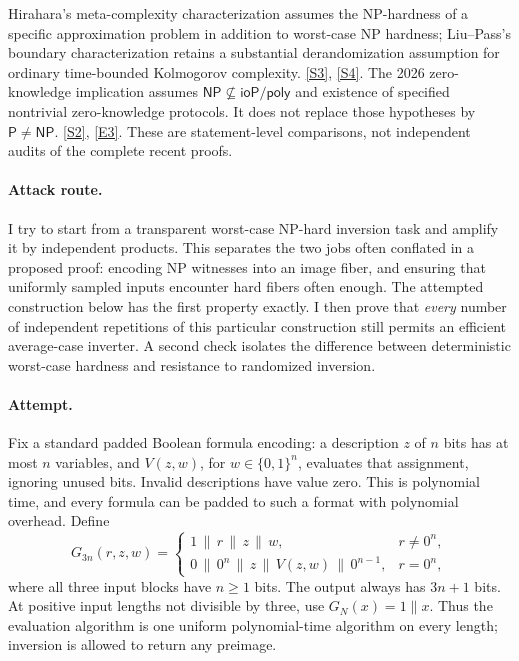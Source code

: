 \documentclass[11pt,a4paper]{article}
\newcommand{\sref}[2]{\hyperlink{source:#1:#2}{[S#2]}}
\newcommand{\eref}[2]{\hyperlink{extra:#1:#2}{[E#2]}}
\numberwithin{equation}{section}
\begin{document}
Hirahara's meta-complexity characterization assumes the NP-hardness of a
specific approximation problem in addition to worst-case NP hardness;
Liu--Pass's boundary characterization retains a substantial derandomization
assumption for ordinary time-bounded Kolmogorov complexity.
\sref{30006686}{3}, \sref{30006686}{4}. The 2026 zero-knowledge implication assumes
$\mathsf{NP}\not\subseteq\mathsf{ioP/poly}$ and existence of specified
nontrivial zero-knowledge protocols. It does not replace those hypotheses
by $\mathsf P\ne\mathsf{NP}$. \sref{30006686}{2}, \eref{30006686}{3}.
These are statement-level comparisons, not independent audits of the
complete recent proofs.

\paragraph{Attack route.}
I try to start from a transparent worst-case NP-hard inversion task and
amplify it by independent products. This separates the two jobs often
conflated in a proposed proof: encoding NP witnesses into an image fiber,
and ensuring that uniformly sampled inputs encounter hard fibers often
enough. The attempted construction below has the first property exactly.
I then prove that \emph{every} number of independent repetitions of this
particular construction still permits an efficient average-case inverter.
A second check isolates the difference between deterministic worst-case
hardness and resistance to randomized inversion.

\paragraph{Attempt.}
Fix a standard padded Boolean formula encoding: a description $z$ of $n$
bits has at most $n$ variables, and $V(z,w)$, for $w\in\{0,1\}^n$, evaluates
that assignment, ignoring unused bits. Invalid descriptions have value zero.
This is polynomial time, and every formula can be padded to such a format
with polynomial overhead. Define
\begin{equation}\label{r33:rare}
 G_{3n}(r,z,w)=
 \begin{cases}
  1\,\|\,r\,\|\,z\,\|\,w,&r\ne0^n,\\
  0\,\|\,0^n\,\|\,z\,\|\,V(z,w)\,\|\,0^{n-1},&r=0^n,
 \end{cases}
\end{equation}
where all three input blocks have $n\ge1$ bits. The output always has
$3n+1$ bits. At positive input lengths not divisible by three, use
$G_N(x)=1\|x$. Thus the evaluation algorithm is one uniform polynomial-time
algorithm on every length; inversion is allowed to return any preimage.
\end{document}

